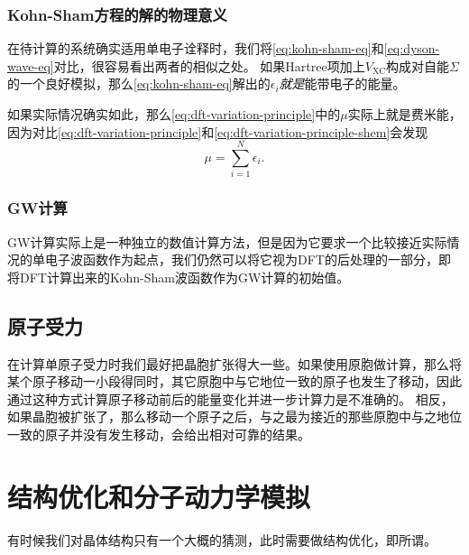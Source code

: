 \subsubsection{Kohn-Sham方程的解的物理意义}

在待计算的系统确实适用单电子诠释时，我们将\eqref{eq:kohn-sham-eq}和\eqref{eq:dyson-wave-eq}对比，很容易看出两者的相似之处。
如果Hartree项加上$V_\text{XC}$构成对自能$\Sigma$的一个良好模拟，那么\eqref{eq:kohn-sham-eq}解出的$\epsilon_i$\emph{就是}能带电子的能量。

如果实际情况确实如此，那么\eqref{eq:dft-variation-principle}中的$\mu$实际上就是费米能，因为对比\eqref{eq:dft-variation-principle}和\eqref{eq:dft-variation-principle-shem}会发现
\begin{equation}
    \mu = \sum_{i=1}^N \epsilon_i.
\end{equation}

\subsubsection{GW计算}

GW计算实际上是一种独立的数值计算方法，但是因为它要求一个比较接近实际情况的单电子波函数作为起点，我们仍然可以将它视为DFT的后处理的一部分，即将DFT计算出来的Kohn-Sham波函数作为GW计算的初始值。

\subsection{原子受力}

在计算单原子受力时我们最好把晶胞扩张得大一些。如果使用原胞做计算，那么将某个原子移动一小段得同时，其它原胞中与它地位一致的原子也发生了移动，因此通过这种方式计算原子移动前后的能量变化并进一步计算力是不准确的。
相反，如果晶胞被扩张了，那么移动一个原子之后，与之最为接近的那些原胞中与之地位一致的原子并没有发生移动，会给出相对可靠的结果。

\section{结构优化和分子动力学模拟}

有时候我们对晶体结构只有一个大概的猜测，此时需要做结构优化，即所谓。

